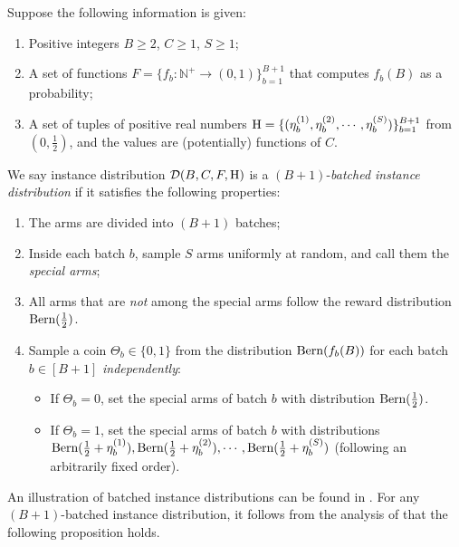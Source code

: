 \begin{definition}
	\label{def:batch-instance}
	Suppose the following information is given:  
	\begin{enumerate}[label=\roman*).]
		\item Positive integers $B\geq 2$, $C\geq 1$, $S \geq 1$; 
		\item A set of functions $F=\{f_{b}: \mathbb{N}^{+}\rightarrow (0,1)\}_{b=1}^{B+1}$ that computes $f_{b}(B)$ as a probability; 
		\item A set of tuples of positive real numbers $\mathrm{H} = \{(\eta^{(1)}_{b}, \eta^{(2)}_{b}, \cdots, \eta^{(S)}_{b})\}_{b=1}^{B+1}$ from $(0, \frac12)$, and the values are (potentially) functions of $C$.
	\end{enumerate}
	We say instance distribution $\mathcal{D}(B,C,F, \mathrm{H})$ is a $(B+1)$-\emph{batched instance distribution} if it satisfies the following properties:
	\begin{enumerate}[label=\alph*).]
		\item The arms are divided into $(B+1)$ batches;
		\item Inside each batch $b$, sample $S$ arms uniformly at random, and call them the \emph{special arms};
		\item All arms that are \emph{not} among the special arms follow the reward distribution $\textnormal{Bern}(\frac{1}{2})$.
		\item Sample a coin $\Theta_{b}\in \{0, 1\}$ from the distribution $\textnormal{Bern}(f_{b}(B))$ for each batch $b\in [B+1]$ \emph{independently}:
		\begin{itemize}
			\item If $\Theta_{b}=0$, set the special arms of batch $b$ with distribution $\textnormal{Bern}(\frac{1}{2})$.
			\item If $\Theta_{b}=1$, set the special arms of batch $b$ with distributions $\textnormal{Bern}(\frac{1}{2}+\eta^{(1)}_{b}), \textnormal{Bern}(\frac{1}{2}+\eta^{(2)}_{b}), \cdots, \textnormal{Bern}(\frac{1}{2}+\eta^{(S)}_{b})$ (following an arbitrarily fixed order).
		\end{itemize}
	\end{enumerate}
\end{definition}

An illustration of batched instance distributions can be found in . For any $(B+1)$-batched instance distribution, it follows from the analysis of \cite{AW23BestArm} that the following proposition holds.

